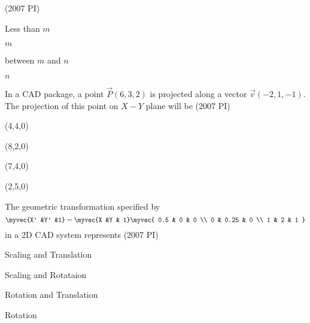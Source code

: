 \hfill(2007 PI)
\begin{enumerate}
\begin{multicols}{4}
    \item Less than $m$
    \item $m$
    \item between $m$ and $n$
    \item $n$
    \end{multicols}
    \end{enumerate}
\item
In a CAD package, a point $\vec{P}(6, 3, 2)$ is projected along a vector $\vec{v}(-2,1,-1 )$. The projection of this point on $X-Y$ plane will be
\hfill(2007 PI)
\begin{enumerate}
\begin{multicols}{4}
    \item (4,4,0)
    \item (8,2,0)
    \item (7,4,0)
    \item (2,5,0)
    \end{multicols}
\end{enumerate}
%
\item
The geometric transformation specified by 
$$\myvec{X' &Y' &1} = \myvec{X &Y & 1}
 \myvec{
0.5 & 0 & 0 \\
0 & 0.25 & 0 \\
1 & 2 & 1
}$$ in a 2D CAD system represents
\hfill(2007 PI)
\begin{enumerate}
\begin{multicols}{2}
    \item Scaling and Translation
    \item Scaling and Rotataion
    \item Rotation and Translation
    \item Rotation
    \end{multicols}
\end{enumerate}
